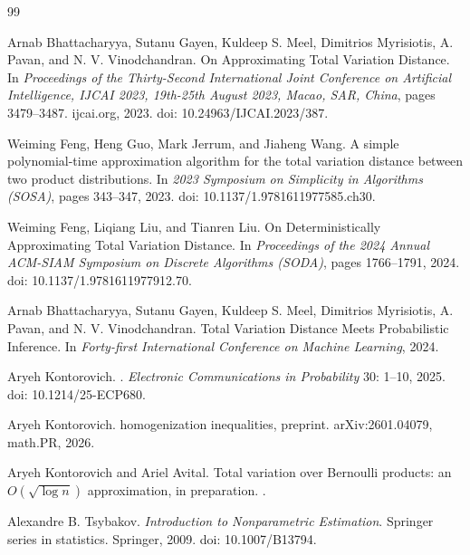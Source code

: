 \documentclass[11pt]{amsart}
\numberwithin{equation}{section}
\theoremstyle{definition}
\begin{document}
\begin{thebibliography}{99}

Arnab Bhattacharyya, Sutanu Gayen, Kuldeep S. Meel, Dimitrios Myrisiotis, A. Pavan, and N. V. Vinodchandran.
\newblock On Approximating Total Variation Distance.
\newblock In \emph{Proceedings of the Thirty-Second International Joint Conference on Artificial Intelligence, {IJCAI} 2023, 19th-25th August 2023, Macao, SAR, China}, pages 3479--3487. ijcai.org, 2023.
\newblock doi: 10.24963/IJCAI.2023/387.

Weiming Feng, Heng Guo, Mark Jerrum, and Jiaheng Wang.
\newblock A simple polynomial-time approximation algorithm for the total variation distance between two product distributions.
\newblock In \emph{2023 Symposium on Simplicity in Algorithms (SOSA)}, pages 343--347, 2023.
\newblock doi: 10.1137/1.9781611977585.ch30.

Weiming Feng, Liqiang Liu, and Tianren Liu.
\newblock On Deterministically Approximating Total Variation Distance.
\newblock In \emph{Proceedings of the 2024 Annual ACM-SIAM Symposium on Discrete Algorithms (SODA)}, pages 1766--1791, 2024.
\newblock doi: 10.1137/1.9781611977912.70.

Arnab Bhattacharyya, Sutanu Gayen, Kuldeep S. Meel, Dimitrios Myrisiotis, A. Pavan, and N. V. Vinodchandran.
\newblock Total Variation Distance Meets Probabilistic Inference.
\newblock In \emph{Forty-first International Conference on Machine Learning}, 2024.

Aryeh Kontorovich.
.
\newblock \emph{Electronic Communications in Probability} 30: 1--10, 2025.
\newblock doi: 10.1214/25-ECP680.

Aryeh Kontorovich.
 homogenization inequalities, preprint.
\newblock arXiv:2601.04079, math.PR, 2026.

Aryeh Kontorovich and Ariel Avital.
\newblock Total variation over {B}ernoulli products: an {$O(\sqrt{\log n})$} approximation, in preparation.
.

Alexandre B. Tsybakov.
\newblock \emph{Introduction to Nonparametric Estimation}.
\newblock Springer series in statistics. Springer, 2009.
\newblock doi: 10.1007/B13794.

\end{thebibliography}
\end{document}
